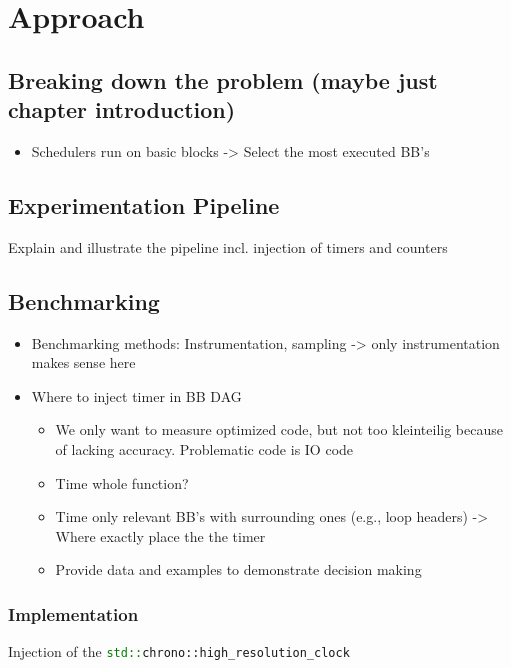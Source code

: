 \chapter{Approach}

\section{Breaking down the problem (maybe just chapter introduction)}
\begin{itemize}
    \item Schedulers run on basic blocks -> Select the most executed BB's
\end{itemize}

\section{Experimentation Pipeline}
Explain and illustrate the pipeline incl. injection of timers and counters

\section{Benchmarking}
\begin{itemize}
    \item Benchmarking methods: Instrumentation, sampling -> only instrumentation makes sense here
    \item Where to inject timer in BB DAG
    \begin{itemize}
        \item We only want to measure optimized code, but not too kleinteilig because of lacking accuracy. Problematic code is IO code
        \item Time whole function?
        \item Time only relevant BB's with surrounding ones (e.g., loop headers) -> Where exactly place the the timer
        \item Provide data and examples to demonstrate decision making
    \end{itemize} 
\end{itemize}
\subsection{Implementation}
Injection of the \lstinline[language=C++]|std::chrono::high_resolution_clock|
